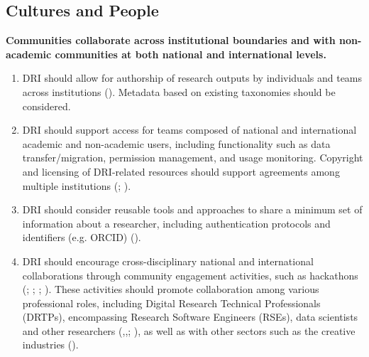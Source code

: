 \documentclass[11pt]{scrartcl}
\begin{document}
\subsection{Cultures and People}

\noindent\textbf{Communities collaborate across institutional boundaries and with non-academic communities at both national and international levels.}  

\begin{enumerate}
\item DRI should allow for authorship of research outputs by individuals and teams across institutions (\cite[5]{evans23}). Metadata based on existing taxonomies
should be considered.  

\item DRI should support access for teams composed of national and international academic and non-academic users, including functionality such as data transfer/migration, permission management, and usage monitoring. Copyright and licensing of DRI-related resources should support agreements among multiple institutions 
(\cite{de_roure_2022_4716148}; \cite[5]{Zwiggelaar22}). 

\item\label{itm:aut} DRI should consider reusable tools and approaches to share a minimum set of information about a researcher, including authentication protocols and identifiers (e.g. ORCID)
(\cite[6]{collier25}).


\item DRI should encourage cross-disciplinary national and international collaborations through community engagement activities, such as hackathons 
(\cite[4]{de_roure_2022_4716148}; \cite[2]{bell_2025_17099176}; \cite[15]{romanova_2021_5105938}; \cite{sichani_2023_8177926}). 
These activities should promote collaboration among various professional roles, including Digital Research Technical Professionals (DRTPs), encompassing Research Software Engineers (RSEs), data scientists and other researchers (\cite{step,discourse},\cite[8]{de_roure_2022_4716148},\cite{beavan_2025a_15083396}; \cite[30]{taylor_2022_10518740}), as well as with other sectors such as the creative industries (\cite{romanova_2021_5105938}).  
\end{enumerate}
\end{document}
